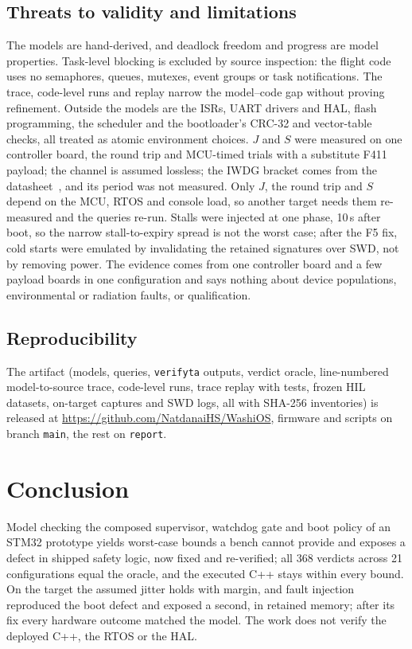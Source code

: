 \documentclass[conference,a4paper]{IEEEtran}
\newif\ifanon
\begin{document}
\subsection{Threats to validity and limitations}
The models are hand-derived, and deadlock freedom and progress are model properties. Task-level blocking is excluded by source inspection: the flight code uses no semaphores, queues, mutexes, event groups or task notifications. The trace, code-level runs and replay narrow the model--code gap without proving refinement. Outside the models are the ISRs, UART drivers and HAL, flash programming, the scheduler and the bootloader's CRC-32 and vector-table checks, all treated as atomic environment choices. $J$ and $S$ were measured on one controller board, the round trip and MCU-timed trials with a substitute F411 payload; the channel is assumed lossless; the IWDG bracket comes from the datasheet~\cite{st2021ds12589}, and its period was not measured. Only $J$, the round trip and $S$ depend on the MCU, RTOS and console load, so another target needs them re-measured and the queries re-run. Stalls were injected at one phase, 10\,s after boot, so the narrow stall-to-expiry spread is not the worst case; after the F5 fix, cold starts were emulated by invalidating the retained signatures over SWD, not by removing power. The evidence comes from one controller board and a few payload boards in one configuration and says nothing about device populations, environmental or radiation faults, or qualification.


\subsection{Reproducibility}
The artifact (models, queries, \texttt{verifyta} outputs, verdict oracle, line-numbered model-to-source trace, code-level runs, trace replay with tests, frozen HIL datasets, on-target captures and SWD logs, all with SHA-256 inventories) \ifanon is released on acceptance; the firmware is not, so the trace is pinned to a tagged internal revision and source excerpts can be supplied through the chairs.\else is released at \url{https://github.com/NatdanaiHS/WashiOS}, firmware and scripts on branch \texttt{main}, the rest on \texttt{report}.\fi

\section{Conclusion}
Model checking the composed supervisor, watchdog gate and boot policy of an STM32 prototype yields worst-case bounds a bench cannot provide and exposes a defect in shipped safety logic, now fixed and re-verified; all 368 verdicts across 21 configurations equal the oracle, and the executed C++ stays within every bound. On the target the assumed jitter holds with margin, and fault injection reproduced the boot defect and exposed a second, in retained memory; after its fix every hardware outcome matched the model. The work does not verify the deployed C++, the RTOS or the HAL.
\end{document}
